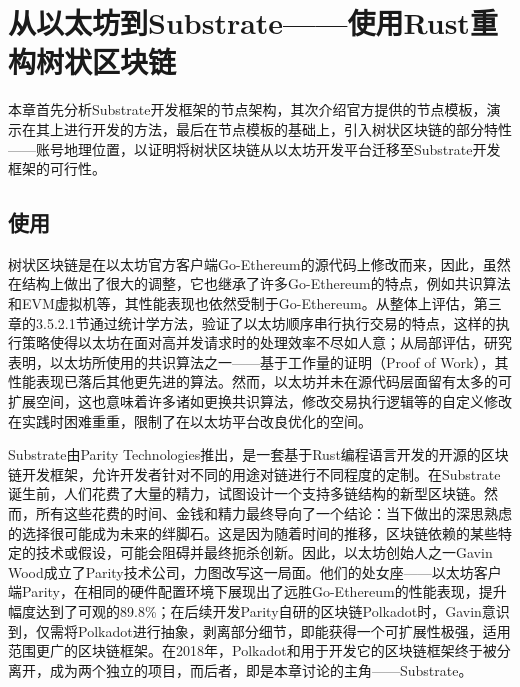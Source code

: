%
%
%
%
%

\chapter{从以太坊到Substrate——使用Rust重构树状区块链}

本章首先分析Substrate开发框架的节点架构，其次介绍官方提供的节点模板，演示在其上进行开发的方法，最后在节点模板的基础上，引入树状区块链的部分特性——账号地理位置，以证明将树状区块链从以太坊开发平台迁移至Substrate开发框架的可行性。

\section{使用}

树状区块链是在以太坊官方客户端Go-Ethereum的源代码上修改而来，因此，虽然在结构上做出了很大的调整，它也继承了许多Go-Ethereum的特点，例如共识算法和EVM虚拟机等，其性能表现也依然受制于Go-Ethereum。从整体上评估，第三章的3.5.2.1节通过统计学方法，验证了以太坊顺序串行执行交易的特点，这样的执行策略使得以太坊在面对高并发请求时的处理效率不尽如人意；从局部评估，研究\cite{privateChainConsensus}表明，以太坊所使用的共识算法之一——基于工作量的证明（Proof of Work），其性能表现已落后其他更先进的算法。然而，以太坊并未在源代码层面留有太多的可扩展空间，这也意味着许多诸如更换共识算法，修改交易执行逻辑等的自定义修改在实践时困难重重，限制了在以太坊平台改良优化的空间。

Substrate\cite{substrateHome}由Parity Technologies推出，是一套基于Rust编程语言开发的开源的区块链开发框架，允许开发者针对不同的用途对链进行不同程度的定制。在Substrate诞生前，人们花费了大量的精力，试图设计一个支持多链结构的新型区块链。然而，所有这些花费的时间、金钱和精力最终导向了一个结论：当下做出的深思熟虑的选择很可能成为未来的绊脚石。这是因为随着时间的推移，区块链依赖的某些特定的技术或假设，可能会阻碍并最终扼杀创新\cite{substrateDoc}。因此，以太坊创始人之一Gavin Wood成立了Parity技术公司，力图改写这一局面。他们的处女座——以太坊客户端Parity，在相同的硬件配置环境下展现出了远胜Go-Ethereum的性能表现，提升幅度达到了可观的89.8\%\cite{parityVSgeth}；在后续开发Parity自研的区块链Polkadot时，Gavin意识到，仅需将Polkadot进行抽象，剥离部分细节，即能获得一个可扩展性极强，适用范围更广的区块链框架。在2018年，Polkadot和用于开发它的区块链框架终于被分离开，成为两个独立的项目，而后者，即是本章讨论的主角——Substrate。

